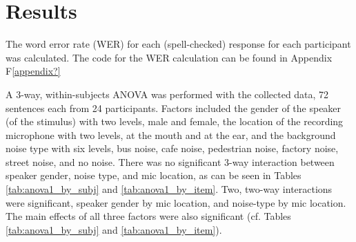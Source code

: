 \documentclass[dissertation,copyright]{uathesis}
\begin{document}
\section{Results}



The word error rate (WER) for each (spell-checked) response for each participant was calculated. The code for the WER calculation can be found in Appendix F\ref{appendix?}

A 3-way, within-subjects ANOVA was performed with the collected data, 72 sentences each from 24 participants. Factors included the gender of the speaker (of the stimulus) with two levels, male and female, the location of the recording microphone with two levels, at the mouth and at the ear, and the background noise type with six levels, bus noise, cafe noise, pedestrian noise, factory noise, street noise, and no noise.  There was no significant 3-way interaction between speaker gender, noise type, and mic location, as can be seen in Tables \ref{tab:anova1_by_subj} and \ref{tab:anova1_by_item}. Two, two-way interactions were significant, speaker gender by mic location, and noise-type by mic location.  The main effects of all three factors were also significant (cf. Tables \ref{tab:anova1_by_subj} and \ref{tab:anova1_by_item}).
\end{document}
